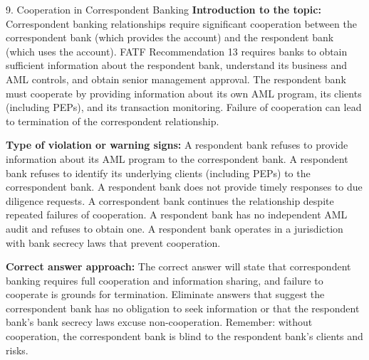 \documentclass[11pt,a4paper]{beamer}
\begin{document}
\begin{frame}{9. Cooperation in Correspondent Banking}
\tiny
\noindent\textbf{Introduction to the topic:} Correspondent banking relationships require significant cooperation between the correspondent bank (which provides the account) and the respondent bank (which uses the account). FATF Recommendation 13 requires banks to obtain sufficient information about the respondent bank, understand its business and AML controls, and obtain senior management approval. The respondent bank must cooperate by providing information about its own AML program, its clients (including PEPs), and its transaction monitoring. Failure of cooperation can lead to termination of the correspondent relationship.

\vspace{0.1cm}
\noindent\textbf{Type of violation or warning signs:} A respondent bank refuses to provide information about its AML program to the correspondent bank. A respondent bank refuses to identify its underlying clients (including PEPs) to the correspondent bank. A respondent bank does not provide timely responses to due diligence requests. A correspondent bank continues the relationship despite repeated failures of cooperation. A respondent bank has no independent AML audit and refuses to obtain one. A respondent bank operates in a jurisdiction with bank secrecy laws that prevent cooperation.

\vspace{0.1cm}
\noindent\textbf{Correct answer approach:} The correct answer will state that correspondent banking requires full cooperation and information sharing, and failure to cooperate is grounds for termination. Eliminate answers that suggest the correspondent bank has no obligation to seek information or that the respondent bank's bank secrecy laws excuse non-cooperation. Remember: without cooperation, the correspondent bank is blind to the respondent bank's clients and risks.
\end{frame}
\end{document}
